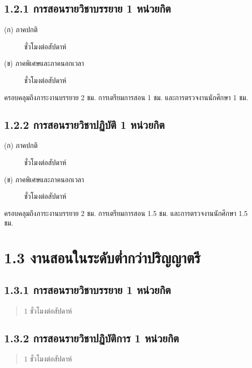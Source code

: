 \documentclass[a4paper,12pt,english]{sphinxmanual}
\begin{document}
\subsection{1.2.1 การสอนรายวิชาบรรยาย 1 หน่วยกิต}
\label{\detokenize{1teaching:id9}}\begin{description}
\item[{(ก) ภาคปกติ}]  ชั่วโมงต่อสัปดาห์

\item[{(ข) ภาคพิเศษและภาคนอกเวลา}]  ชั่วโมงต่อสัปดาห์

\end{description}

ครอบคลุมถึงภาระงานบรรยาย 2 ชม. การเตรียมการสอน 1 ชม. และการตรวจงานนักศึกษา 1 ชม.


\subsection{1.2.2 การสอนรายวิชาปฏิบัติ 1 หน่วยกิต}
\label{\detokenize{1teaching:id10}}\begin{description}
\item[{(ก) ภาคปกติ}]  ชั่วโมงต่อสัปดาห์

\item[{(ข) ภาคพิเศษและภาคนอกเวลา}]  ชั่วโมงต่อสัปดาห์

\end{description}

ครอบคลุมถึงภาระงานบรรยาย 2 ชม.
การเตรียมการสอน 1.5 ชม. และการตรวจงานนักศึกษา 1.5 ชม.


\section{1.3 งานสอนในระดับต่ำกว่าปริญญาตรี}
\label{\detokenize{1teaching:id11}}

\subsection{1.3.1 การสอนรายวิชาบรรยาย 1 หน่วยกิต}
\label{\detokenize{1teaching:id12}}\begin{quote}

1 ชั่วโมงต่อสัปดาห์
\end{quote}


\subsection{1.3.2 การสอนรายวิชาปฏิบัติการ 1 หน่วยกิต}
\label{\detokenize{1teaching:id13}}\begin{quote}

1 ชั่วโมงต่อสัปดาห์
\end{quote}
\end{document}
